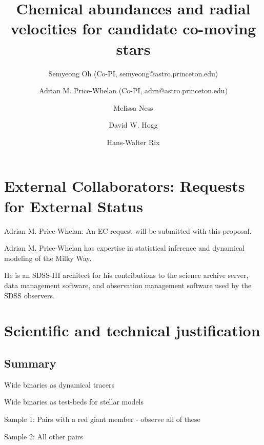 \documentclass[11pt]{article}
\title{Chemical abundances and radial velocities for candidate co-moving stars}
\author[1]{Semyeong Oh (Co-PI, semyeong@astro.princeton.edu)}
\author[1]{Adrian M. Price-Whelan (Co-PI, adrn@astro.princeton.edu)}
\affil[1]{Princeton University, USA}
\author[2]{Melissa Ness}
\affil[2]{Max Planck Institute for Astronomy, Germany}
\author[3,2]{David W. Hogg}
\affil[3]{New York University, USA}
\author[2]{Hans-Walter Rix}
\date{}
\begin{document}
\maketitle

\section*{External Collaborators: Requests for External Status}

Adrian M. Price-Whelan: An EC request will be submitted with this proposal.

Adrian M. Price-Whelan has expertise in statistical inference and dynamical
modeling of the Milky Way.

He is an SDSS-III architect for his contributions to the
science archive server, data management software, and observation management
software used by the SDSS observers.

\section{Scientific and technical justification}

\subsection{Summary}

Wide binaries as dynamical tracers

Wide binaries as test-beds for stellar models

Sample 1: Pairs with a red giant member - observe all of these

Sample 2: All other pairs
\end{document}
